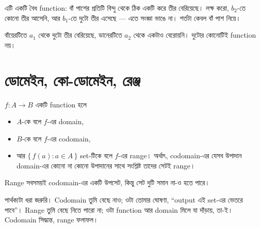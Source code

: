 \documentclass[11pt]{article}
\begin{document}
\noindent
এটি একটি বৈধ function: বাঁ পাশের প্রতিটি বিন্দু থেকে ঠিক একটি করে তীর
বেরিয়েছে। লক্ষ করো, $b_2$-তে কোনো তীর আসেনি, আর $b_1$-তে দুটো তীর এসেছে ---
এতে সংজ্ঞা ভাঙে না। শর্তটা কেবল বাঁ পাশ নিয়ে।

\begin{center}
\end{center}

\noindent
বাঁয়েরটিতে $a_1$ থেকে দুটো তীর বেরিয়েছে, ডানেরটিতে $a_2$ থেকে একটাও বেরোয়নি।
দুটোর কোনোটিই function নয়।


\section{ডোমেইন, কো-ডোমেইন, রেঞ্জ}

\begin{idea}[তিনটি সেট]
$f \colon A \to B$ একটি function হলে
\begin{itemize}
  \item $A$-কে বলে $f$-এর domain,
  \item $B$-কে বলে $f$-এর codomain,
  \item আর $\{\, f(a) : a \in A \,\}$ set-টিকে বলে $f$-এর range। অর্থাৎ, codomain-এর যেসব উপাদান domain-এর কোনো না কোনো উপাদানের সাথে সংশ্লিষ্ট তাদের সেটই range।
\end{itemize}
Range সবসময়ই codomain-এর একটি উপসেট, কিন্তু সেট দুটি সমান না-ও হতে পারে।

পার্থক্যটা ধরা জরুরি। Codomain তুমি বেছে নাও; ওটা তোমার ঘোষণা, ``output
এই set-এর ভেতরে পাবে''। Range তুমি বেছে নিতে পারো না; ওটা function আর domain
মিলে যা দাঁড়ায়, তা-ই। Codomain সিদ্ধান্ত, range ফলাফল।
\end{idea}
\end{document}
